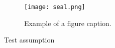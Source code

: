 \documentclass{ncs-thesis}
\begin{document}
\makecover                          %
\makeverification                   %


\maketableofcontents                %
\makelistoffigures                  %
\makelistoftables                   %



\begin{figure}[htbp]
    \centerline{\texttt{[image: seal.png]}}
    \caption{Example of a figure caption.}
    \label{fig}
\end{figure}

\begin{assumption}
    Test assumption
\end{assumption}


\mainmatter





\printbibliography



\end{document}
